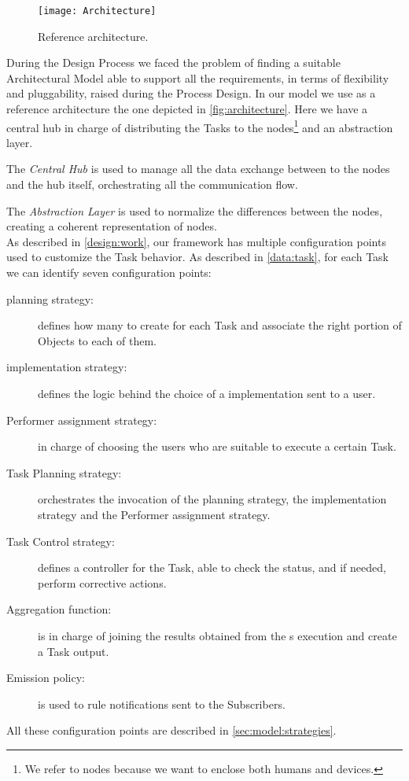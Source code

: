 \begin{figure}[htb]
	\centering
	\texttt{[image: Architecture]}
	\caption{Reference architecture.}
	\label{fig:architecture}
\end{figure}

During the Design Process we faced the problem of finding a suitable Architectural
Model able to support all the requirements, in terms of flexibility and pluggability,
raised during the Process Design. In our model we use as a reference architecture
the one depicted in \autoref{fig:architecture}. Here we have a central hub
in charge of distributing the Tasks to the nodes\footnote{We refer to nodes
because we want to enclose both humans and devices.} and an abstraction layer.

The \emph{Central Hub} is used to manage all the data exchange between to the
nodes and the hub itself, orchestrating all the communication flow.

The \emph{Abstraction Layer} is used to normalize the differences between the
nodes, creating a coherent representation of nodes.\\




As described in \ref{design:work}, our framework has multiple configuration
points used to customize the Task behavior. As described in \vref{data:task},
for each Task we can identify seven configuration points:
\begin{description}
	\item[\utask{} planning strategy:] defines how many \utask{} to create for
	each Task and associate the right portion of Objects to each of them.
	\item[\utask{} implementation strategy:] defines the logic behind the choice
	of a \utask{} implementation sent to a user.
	\item[Performer assignment strategy:] in charge of choosing the users who
	are suitable to execute a certain Task.
	\item[Task Planning strategy:] orchestrates the invocation of the \utask{}
	planning strategy, the \utask{} implementation strategy and the Performer
	assignment strategy.
	\item[Task Control strategy:] defines a controller for the Task, able to
	check the status, and if needed, perform corrective actions.
	\item[Aggregation function:] is in charge of joining the results obtained
	from the \utask{}s execution and create a Task output.
	\item[Emission policy:] is used to rule notifications sent to the Subscribers.
\end{description}
All these configuration points are described in \ref{sec:model:strategies}.